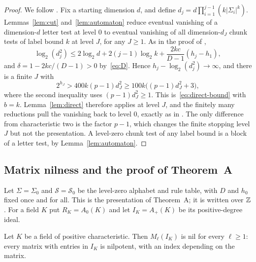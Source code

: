 \begin{proof}
We follow \cite[Proposition~3.6]{OAI247periodic}. Fix a starting dimension $d$, and define
$d_j=d\prod_{i=1}^{j-1}(k|\Sigma_i|^k)$. Lemmas~\ref{lem:cut} and~\ref{lem:automaton} reduce eventual vanishing of a
dimension-$d$ letter test at level $0$ to eventual vanishing of all dimension-$d_J$ chunk tests of label bound $k$ at
level $J$, for any $J\geq1$. As in the proof of \cite[Proposition~3.6]{OAI247periodic},
\[
 \log_2(d_j^2)\leq2\log_2d+2(j-1)\log_2k+\frac{2kc}{D-1}(h_j-h_1),
\]
and $\delta=1-2kc/(D-1)>0$ by~\eqref{eq:D}. Hence $h_j-\log_2(d_j^2)\to\infty$, and there is a finite $J$ with
\[
 2^{h_J}>400k(p-1)d_J^2\geq100k\bigl((p-1)d_J^2+3\bigr),
\]
where the second inequality uses $(p-1)d_J^2\geq1$. This is~\eqref{eq:direct-bound} with $b=k$. Lemma~\ref{lem:direct}
therefore applies at level $J$, and the finitely many reductions pull the vanishing back to level $0$, exactly as in
\cite{OAI247periodic}. The only difference from characteristic two is the factor $p-1$, which changes the finite stopping
level $J$ but not the presentation. A level-zero chunk test of any label bound is a block of a letter test, by
Lemma~\ref{lem:automaton}.
\end{proof}

\subsection{Matrix nilness and the proof of Theorem~A}

Let $\Sigma=\Sigma_0$ and $\mathcal S=\mathcal S_0$ be the level-zero alphabet and rule table, with $D$ and $h_0$ fixed
once and for all. This is the presentation of Theorem~A; it is written over $\mathbb Z$. For a field $K$ put $R_K=A_0(K)$ and
let $I_K=A_+(K)$ be its positive-degree ideal.

\begin{theorem}\label{thm:matrix-nil}
Let $K$ be a field of positive characteristic. Then $M_\ell(I_K)$ is nil for every $\ell\geq1$: every matrix with
entries in $I_K$ is nilpotent, with an index depending on the matrix.
\end{theorem}

